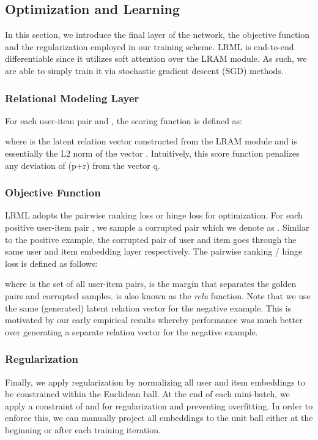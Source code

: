 \documentclass[sigconf]{acmart}
\begin{document}
\subsection{Optimization and Learning}
In this section, we introduce the final layer of the network, the objective function and the regularization employed in our training scheme. \textsc{LRML} is end-to-end differentiable since it utilizes soft attention over the LRAM module. As such, we are able to simply train it via stochastic gradient descent (SGD) methods. 
\subsubsection{Relational Modeling Layer}
For each user-item pair  and , the scoring function is defined as:

where  is the latent relation vector constructed from the LRAM module and  is essentially the L2 norm of the vector . Intuitively, this score function penalizes any deviation of (p+r) from the vector q.
\subsubsection{Objective Function}
\textsc{LRML} adopts the pairwise ranking loss or hinge loss for optimization. For each positive user-item pair , we sample a corrupted pair which we denote as . Similar to the positive example, the corrupted pair of user and item goes through the same user and item embedding layer respectively. The pairwise ranking / hinge loss is defined as follows:

where  is the set of all user-item pairs,  is the margin that separates the golden pairs and corrupted samples. is also known as the \textit{relu} function. Note that we use the same (generated) latent relation vector for the negative example. This is motivated by our early empirical results whereby performance was much better over generating a separate relation vector for the negative example. 
\subsubsection{Regularization}
Finally, we apply regularization by normalizing all user and item embeddings to be constrained within the Euclidean ball. At the end of each mini-batch, we apply a constraint of  and  for regularization and preventing overfitting. In order to enforce this, we can manually project all embeddings to the unit ball either at the beginning or after each training iteration. 
\end{document}
